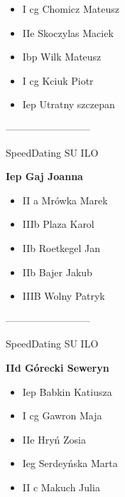 \documentclass[a4paper,10pt]{article}
\begin{document}
\begin{multicols}{3}
\begin{minipage}[l]{\textwidth}
  \begin{itemize}
    \item I cg Chomicz Mateusz
    \item IIe Skoczylas Maciek
    \item Ibp Wilk Mateusz
    \item I cg Kciuk Piotr
    \item Iep Utratny szczepan

    \end{itemize}



\end{minipage}



\begin{minipage}[l]{\textwidth}
--------------------------

  \footnotesize{SpeedDating SU ILO}

  \bfseries{Iep Gaj Joanna}

  \begin{itemize}
    \item II a Mrówka Marek
    \item IIIb Plaza Karol
    \item IIb Roetkegel Jan
    \item IIb Bajer Jakub
    \item IIIB Wolny Patryk

    \end{itemize}



\end{minipage}



\begin{minipage}[l]{\textwidth}
--------------------------

  \footnotesize{SpeedDating SU ILO}

  \bfseries{IId Górecki Seweryn}

  \begin{itemize}
    \item Iep Babkin Katiusza
    \item I cg Gawron Maja
    \item IIe Hryń Zosia
    \item Ieg Serdeyńska Marta
    \item II c Makuch Julia

    \end{itemize}



\end{minipage}




\end{multicols}
\end{document}
